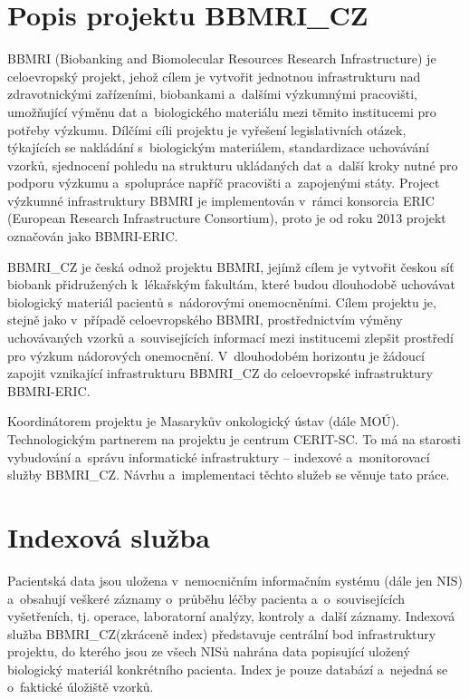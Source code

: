 \documentclass[11pt, final, oneside]{fithesis2}
\newcommand{\ProjectName}{\mbox{BBMRI\_CZ}\xspace}
\begin{document}
\section{Popis projektu \ProjectName}\label{chapter:analysis:section:projectDescription}
BBMRI (Biobanking and Biomolecular Resources Research Infrastructure) je celoevropský projekt, jehož cílem je vytvořit jednotnou infrastrukturu nad zdravotnickými zařízeními, biobankami a~dalšími výzkumnými pracovišti, umožňující výměnu dat a~biologického materiálu mezi těmito institucemi pro potřeby výzkumu. Dílčími cíli projektu je vyřešení legislativních otázek, týkajících se nakládání s~biologickým materiálem, standardizace uchovávání vzorků, sjednocení pohledu na strukturu ukládaných dat a~další kroky nutné pro podporu výzkumu a~spolupráce napříč pracovišti a~zapojenými státy. Project výzkumné infrastruktury BBMRI je implementován v~rámci konsorcia ERIC (European Research Infrastructure Consortium), proto je od roku 2013 projekt označován jako BBMRI-ERIC.

\ProjectName je česká odnož projektu BBMRI, jejímž cílem je vytvořit českou síť biobank přidružených k~lékařským fakultám, které budou dlouhodobě uchovávat biologický materiál pacientů s~nádorovými onemocněními. Cílem projektu je, stejně jako v~případě celoevropského BBMRI, prostřednictvím výměny uchovávaných vzorků a~souvisejících informací mezi institucemi zlepšit prostředí pro výzkum nádorových onemocnění. V~dlouhodobém horizontu je žádoucí zapojit vznikající infrastrukturu \ProjectName do celoevropské infrastruktury BBMRI-ERIC. 

Koordinátorem projektu je Masarykův onkologický ústav (dále MOÚ). Technologickým partnerem na projektu je centrum CERIT-SC. To má na starosti vybudování a~správu informatické infrastruktury – indexové a~monitorovací služby \ProjectName. Návrhu a~implementaci těchto služeb se věnuje tato práce.

\section{Indexová služba}\label{chapter:analysis:section:index}
Pacientská data jsou uložena v~nemocničním informačním systému (dále jen NIS) a~obsahují veškeré záznamy o~průběhu léčby pacienta a~o~souvisejících vyšetřeních, tj. operace, laboratorní analýzy, kontroly a~další záznamy. Indexová služba \ProjectName (zkráceně index) představuje centrální bod infrastruktury projektu, do kterého jsou ze všech NISů nahrána data popisující uložený biologický materiál konkrétního pacienta. Index je pouze databází a~nejedná se o~faktické úložiště vzorků.
\end{document}

